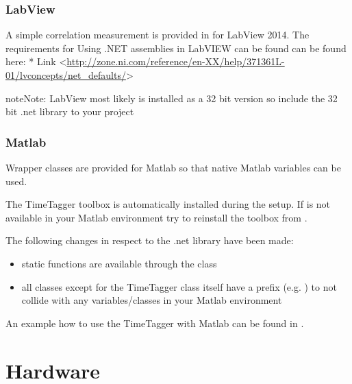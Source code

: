 \documentclass[letterpaper,10pt,english]{sphinxmanual}
\begin{document}
\subsection{LabView}
\label{sections/gettingStarted:labview}
A simple correlation measurement is provided in  for LabView 2014.
The requirements for Using .NET assemblies in LabVIEW can be found can be found here:
* Link \textless{}\url{http://zone.ni.com/reference/en-XX/help/371361L-01/lvconcepts/net\_defaults/}\textgreater{}

\begin{notice}{note}{Note:}
LabView most likely is installed as a 32 bit version so include the 32 bit .net library to your project
\end{notice}


\subsection{Matlab}
\label{sections/gettingStarted:matlab}
Wrapper classes are provided for Matlab so that native Matlab variables can be used.

The TimeTagger toolbox is automatically installed during the setup. If  is not available in your Matlab environment try to reinstall the toolbox from
.

The following changes in respect to the .net library have been made:
\begin{itemize}
\item {} 
static functions are available through the  class

\item {} 
all classes except for the TimeTagger class itself have a  prefix (e.g. ) to not collide with any variables/classes in your Matlab environment

\end{itemize}

An example how to use the TimeTagger with Matlab can be found in .


\chapter{Hardware}
\label{sections/hardware::doc}\label{sections/hardware:hardware}
\end{document}
